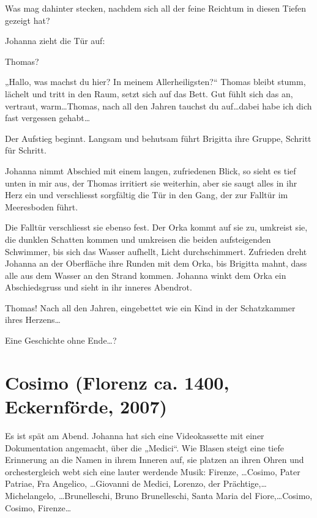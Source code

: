 \documentclass[10pt,titlepage,a5paper]{book}
\begin{document}
Was mag dahinter stecken, nachdem sich all der feine Reichtum in diesen Tiefen gezeigt hat? 

Johanna zieht die Tür auf: 

Thomas?

„Hallo, was machst du hier? In meinem Allerheiligsten?“ Thomas bleibt stumm, lächelt und tritt in den Raum, setzt sich auf das Bett. Gut fühlt sich das an, vertraut, warm\dots  Thomas, nach all den Jahren tauchst du auf\dots  dabei habe ich dich fast vergessen gehabt\dots 

Der Aufstieg beginnt. Langsam und behutsam führt Brigitta ihre Gruppe, Schritt für Schritt.

Johanna nimmt Abschied mit einem langen, zufriedenen Blick, so sieht es tief unten in mir aus, der Thomas irritiert sie weiterhin, aber sie saugt alles in ihr Herz ein und verschliesst sorgfältig die Tür in den Gang, der zur Falltür im Meeresboden führt.

Die Falltür verschliesst sie ebenso fest. Der Orka kommt auf sie zu, umkreist sie, die dunklen Schatten kommen und umkreisen die beiden aufsteigenden Schwimmer, bis sich das Wasser aufhellt, Licht durchschimmert. Zufrieden dreht Johanna an der Oberfläche ihre Runden mit dem Orka, bis Brigitta mahnt, dass alle aus dem Wasser an den Strand kommen. Johanna winkt dem Orka ein Abschiedsgruss und sieht in ihr inneres Abendrot.

Thomas! Nach all den Jahren, eingebettet wie ein Kind in der Schatzkammer ihres Herzens\dots 

Eine Geschichte ohne Ende\dots ?
   


\section*{Cosimo (Florenz ca. 1400, Eckernförde, 2007)}



Es ist spät am Abend. Johanna hat sich eine Videokassette mit einer Dokumentation angemacht, über die „Medici“. Wie Blasen steigt eine tiefe Erinnerung an die Namen in ihrem Inneren auf, sie platzen an ihren Ohren und orchestergleich webt sich eine lauter werdende Musik: Firenze, \dots Cosimo, Pater Patriae, Fra Angelico, \dots Giovanni de Medici, Lorenzo, der Prächtige,\dots Michelangelo, \dots  Brunelleschi, Bruno Brunelleschi, Santa Maria del Fiore,\dots Cosimo, Cosimo, Firenze\dots 
\end{document}
